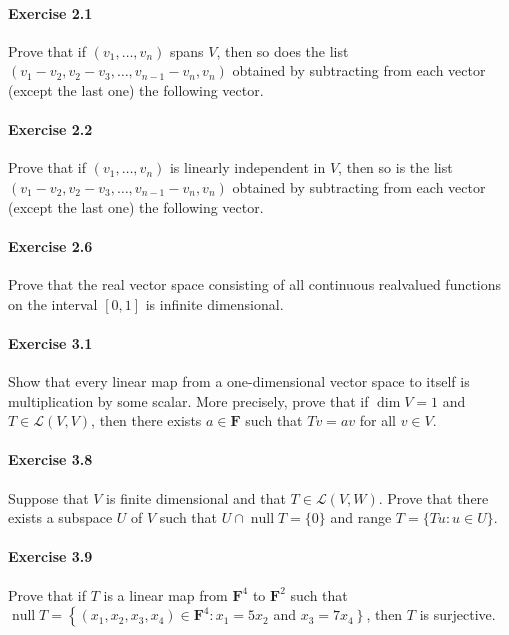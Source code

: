 \documentclass{article}
\begin{document}
\paragraph{Exercise 2.1} Prove that if $\left(v_{1}, \ldots, v_{n}\right)$ spans $V$, then so does the list $\left(v_{1}-v_{2}, v_{2}-v_{3}, \ldots, v_{n-1}-v_{n}, v_{n}\right)$ obtained by subtracting from each vector (except the last one) the following vector.

\paragraph{Exercise 2.2} Prove that if $\left(v_{1}, \ldots, v_{n}\right)$ is linearly independent in $V$, then so is the list $\left(v_{1}-v_{2}, v_{2}-v_{3}, \ldots, v_{n-1}-v_{n}, v_{n}\right)$ obtained by subtracting from each vector (except the last one) the following vector.

\paragraph{Exercise 2.6} Prove that the real vector space consisting of all continuous realvalued functions on the interval $[0,1]$ is infinite dimensional.

\paragraph{Exercise 3.1} Show that every linear map from a one-dimensional vector space to itself is multiplication by some scalar. More precisely, prove that if $\operatorname{dim} V=1$ and $T \in \mathcal{L}(V, V)$, then there exists $a \in \mathbf{F}$ such that $T v=a v$ for all $v \in V$.

\paragraph{Exercise 3.8} Suppose that $V$ is finite dimensional and that $T \in \mathcal{L}(V, W)$. Prove that there exists a subspace $U$ of $V$ such that $U \cap \operatorname{null} T=\{0\}$ and range $T=\{T u: u \in U\}$.

\paragraph{Exercise 3.9} Prove that if $T$ is a linear map from $\mathbf{F}^{4}$ to $\mathbf{F}^{2}$ such that $\operatorname{null} T=\left\{\left(x_{1}, x_{2}, x_{3}, x_{4}\right) \in \mathbf{F}^{4}: x_{1}=5 x_{2}\right.$ and $\left.x_{3}=7 x_{4}\right\}$, then $T$ is surjective.
\end{document}
